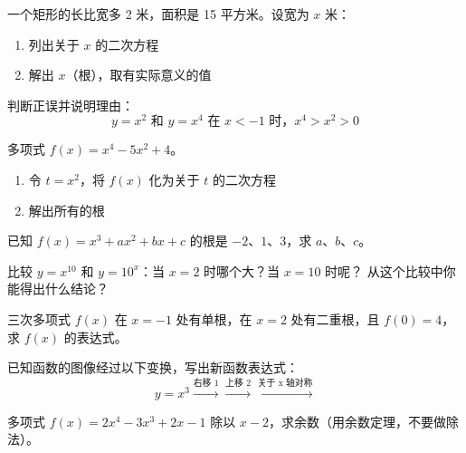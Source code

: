 \begin{exercise}[3]
一个矩形的长比宽多 2 米，面积是 15 平方米。设宽为 \(x\) 米：
\begin{enumerate}
  \item[(1)] 列出关于 \(x\) 的二次方程
  \item[(2)] 解出 \(x\)（根），取有实际意义的值
\end{enumerate}
\end{exercise}

\begin{exercise}[3]
判断正误并说明理由：
\[
y = x^2 \text{ 和 } y = x^4 \text{ 在 } x < -1 \text{ 时，} x^4 > x^2 > 0
\]
\end{exercise}


\begin{exercise}[4]
多项式 \(f(x) = x^4 - 5x^2 + 4\)。
\begin{enumerate}
  \item[(1)] 令 \(t = x^2\)，将 \(f(x)\) 化为关于 \(t\) 的二次方程
  \item[(2)] 解出所有的根
\end{enumerate}
\end{exercise}

\begin{exercise}[4]
已知 \(f(x) = x^3 + ax^2 + bx + c\) 的根是 \(-2\)、\(1\)、\(3\)，求 \(a\)、\(b\)、\(c\)。
\end{exercise}

\begin{exercise}[4]
比较 \(y = x^{10}\) 和 \(y = 10^x\)：当 \(x=2\) 时哪个大？当 \(x=10\) 时呢？
从这个比较中你能得出什么结论？
\end{exercise}

\begin{exercise}[4]
三次多项式 \(f(x)\) 在 \(x=-1\) 处有单根，在 \(x=2\) 处有二重根，且 \(f(0)=4\)，求 \(f(x)\) 的表达式。
\end{exercise}

\begin{exercise}[4]
已知函数的图像经过以下变换，写出新函数表达式：
\[
y = x^3 \xrightarrow{\text{右移 1}} \xrightarrow{\text{上移 2}} \xrightarrow{\text{关于 x 轴对称}}
\]
\end{exercise}


\begin{exercise}[5]
多项式 \(f(x) = 2x^4 - 3x^3 + 2x - 1\) 除以 \(x-2\)，求余数（用余数定理，不要做除法）。
\end{exercise}


